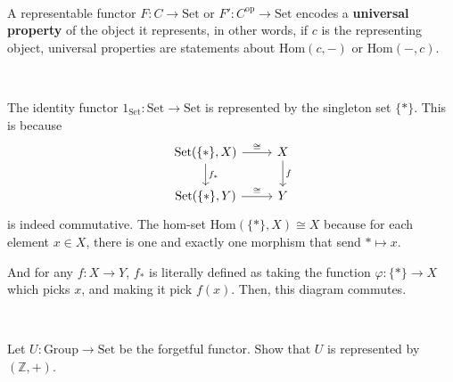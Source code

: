 \documentclass{article}
\begin{document}
\begin{definition}
	\

	A representable functor $F: C \to \text{Set}$ or $F': C^\text{op} \to \text{Set}$ encodes a \textbf{universal property} of the object it represents, in other words, if $c$ is the representing object, universal properties are statements about $\text{Hom}(c, -)$ or $\text{Hom}(-, c)$.
\end{definition}

\begin{example}
	\

	The identity functor $1_\text{Set}:\text{Set} \to \text{Set}$ is represented by the singleton set $\{*\}$. This is because \[ \begin{tikzcd}
			\text{Set}(\{*\}, X) & X\\
			\text{Set}(\{*\}, Y) & Y
			\arrow[from=1-1, to=1-2, "\cong"]
			\arrow[from=1-1, to=2-1, "f_*"]
			\arrow[from=1-2, to=2-2, "f"]
			\arrow[from=2-1, to=2-2, "\cong"]
		\end{tikzcd}\]is indeed commutative. The hom-set $\text{Hom}(\{*\}, X) \cong X$ because for each element $x \in X$, there is one and exactly one morphism that send $* \mapsto x$.

	And for any $f:X \to Y$, $f_*$ is literally defined as taking the function $\varphi: \{*\} \to X$ which picks $x$, and making it pick $f(x)$. Then, this diagram commutes.
\end{example}

\begin{proposition}
\

Let $U: \text{Group} \to \text{Set}$ be the forgetful functor. Show that $U$ is represented by $(\mathbb{Z}, +)$.
\end{proposition}
\end{document}

